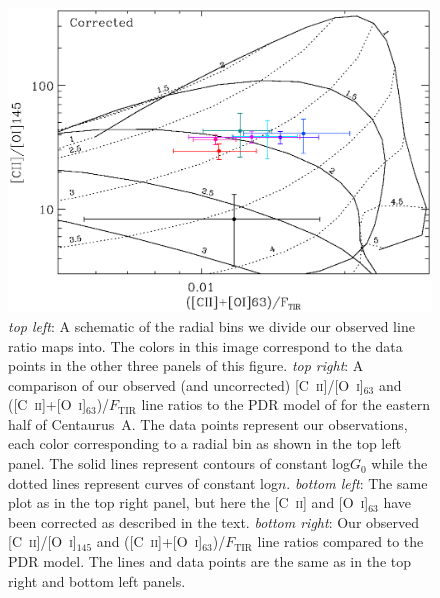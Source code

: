 \documentclass[preprint2]{aastex}
\begin{document}
\begin{figure}
\includegraphics[width=\columnwidth]{CenA_CIIOI145_vs_CIIOI63onFtir_corrected_plot_radial_bins_v2}
\caption{\emph{top left}: A schematic of the radial bins we divide our observed line ratio maps into.  The colors in this image correspond to the data points in the other three panels of this figure. \emph{top right}: A comparison of our observed (and uncorrected) [C~\textsc{ii}]/[O~\textsc{i}]$_{63}$ and ([C~\textsc{ii}]+[O~\textsc{i}]$_{63}$)/$F_{\mathrm{TIR}}$ line ratios to the PDR model of \citet{1999ApJ...527..795K} for the eastern half of Centaurus~A. The data points represent our observations, each color corresponding to a radial bin as shown in the top left panel.  The solid lines represent contours of constant log$G_{0}$ while the dotted lines represent curves of constant log$n$.  \emph{bottom left}: The same plot as in the top right panel, but here the [C~\textsc{ii}] and [O~\textsc{i}]$_{63}$ have been corrected as described in the text. \emph{bottom right}: Our observed [C~\textsc{ii}]/[O~\textsc{i}]$_{145}$ and ([C~\textsc{ii}]+[O~\textsc{i}]$_{63}$)/$F_{\mathrm{TIR}}$ line ratios compared to the PDR model.  The lines and data points are the same as in the top right and bottom left panels.}
\label{fig:pdr_plots}
\end{figure}
\end{document}
